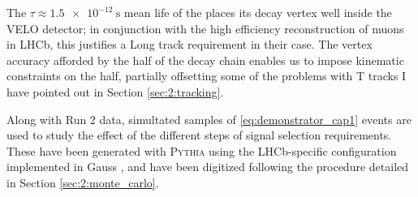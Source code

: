 The $\tau \approx \SI{1.5e-12}{\second}$ mean life of the \lbz \cite{PDG} places its decay vertex well inside the VELO detector; in conjunction with the high efficiency reconstruction of muons in LHCb, this justifies a Long track requirement in their case.
The \lbz vertex accuracy afforded by the \jpsi half of the decay chain enables us to impose kinematic constraints on the \lbz half, partially offsetting some of the problems with T tracks I have pointed out in Section \ref{sec:2:tracking}.

Along with Run 2 data, simultated samples of \eqref{eq:demonstrator_cap1} events are used to study the effect of the different steps of signal selection requirements.
These have been generated with \textsc{Pythia} \cite{Pythia2015} using the LHCb-specific configuration implemented in Gauss \cite{Belyaev_2011}, and have been digitized following the procedure detailed in Section \ref{sec:2:monte_carlo}.